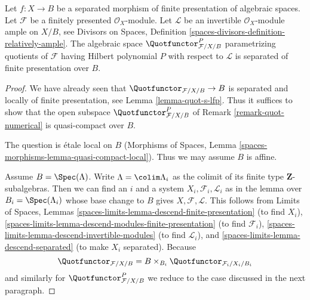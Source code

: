 \begin{lemma}
\label{lemma-quot-qc-over-base}
Let $f : X \to B$ be a separated morphism of finite presentation
of algebraic spaces. Let $\mathcal{F}$ be a finitely presented
$\mathcal{O}_X$-module. Let $\mathcal{L}$ be an invertible
$\mathcal{O}_X$-module ample on $X/B$, see
Divisors on Spaces, Definition
\ref{spaces-divisors-definition-relatively-ample}.
The algebraic space $\Quotfunctor^P_{\mathcal{F}/X/B}$
parametrizing quotients of $\mathcal{F}$
having Hilbert polynomial $P$ with respect to $\mathcal{L}$
is separated of finite presentation over $B$.
\end{lemma}

\begin{proof}
We have already seen that $\Quotfunctor_{\mathcal{F}/X/B} \to B$
is separated and locally of finite presentation, see
Lemma \ref{lemma-quot-s-lfp}. Thus it suffices to show that
the open subspace $\Quotfunctor^P_{\mathcal{F}/X/B}$
of Remark \ref{remark-quot-numerical} is quasi-compact over $B$.

\medskip\noindent
The question is \'etale local on $B$
(Morphisms of Spaces, Lemma \ref{spaces-morphisms-lemma-quasi-compact-local}).
Thus we may assume $B$ is affine.

\medskip\noindent
Assume $B = \Spec(\Lambda)$. Write $\Lambda = \colim \Lambda_i$ as the
colimit of its finite type $\mathbf{Z}$-subalgebras. Then
we can find an $i$ and a system $X_i, \mathcal{F}_i, \mathcal{L}_i$
as in the lemma over $B_i = \Spec(\Lambda_i)$ whose base change to
$B$ gives $X, \mathcal{F}, \mathcal{L}$.
This follows from
Limits of Spaces, Lemmas
\ref{spaces-limits-lemma-descend-finite-presentation} (to find $X_i$),
\ref{spaces-limits-lemma-descend-modules-finite-presentation} (to find
$\mathcal{F}_i$), \ref{spaces-limits-lemma-descend-invertible-modules}
(to find $\mathcal{L}_i$), and \ref{spaces-limits-lemma-descend-separated}
(to make $X_i$ separated). Because
$$
\Quotfunctor_{\mathcal{F}/X/B} = B \times_{B_i}
\Quotfunctor_{\mathcal{F}_i/X_i/B_i}
$$
and similarly for $\Quotfunctor^P_{\mathcal{F}/X/B}$ we reduce
to the case discussed in the next paragraph.


\end{proof}
